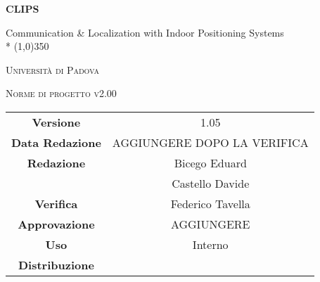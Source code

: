\documentclass[a4paper,12pt]{article}
\author{Conti Oscar Elia, Zanella Marco}
\date{18/02/2016}
\begin{document}
\begin{titlepage}
	\centering
	{\huge\bfseries CLIPS\par}
	Communication \& Localization with Indoor Positioning Systems \\*
	\line(1,0){350} \\
	{\scshape\LARGE Università di Padova \par}
	\vspace{1cm}
	{\scshape\Large Norme di progetto v2.00 \par}
	\logo
	\newpage
		\begin{tabular}{c|c}
			{\hfill \textbf{Versione}} 			& 1.05			\\
			{\hfill\textbf{Data Redazione}} 		& AGGIUNGERE DOPO LA VERIFICA \\ 
			{\hfill\textbf{Redazione}} 			&  Bicego Eduard \\ 
											&  Castello Davide       \\
			{\hfill\textbf{Verifica}} 				&  Federico Tavella   \\
			{\hfill\textbf{Approvazione}} 		&  AGGIUNGERE \\
			{\hfill\textbf{Uso}} 					& Interno			\\
			{\hfill\textbf{Distribuzione}} 			& \leaf			\\
		\end{tabular}
	\end{titlepage}
	\newpage
	\pagestyle{myfront}
	
		\newpage
			\tableofcontents
		\newpage
			\listoffigures	
	\label{LastFrontPage}
	\newpage
	\pagestyle{mymain}
         
    \newpage
		

	\newpage
		
	
	\newpage
		
	
	\newpage
		
		
	\label{LastPage}
\end{document}
